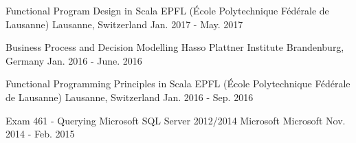   \begin{cventries}
    \cventry{}{}{}{}{}

    \cventry
      {Functional Program Design in Scala}
      {EPFL (École Polytechnique Fédérale de Lausanne)}
      {Lausanne, Switzerland}
      {Jan. 2017 - May. 2017}
      {}

    \cventry
      {Business Process and Decision Modelling}
      {Hasso Plattner Institute}
      {Brandenburg, Germany}
      {Jan. 2016 - June. 2016}
      {}

    \cventry
      {Functional Programming Principles in Scala}
      {EPFL (École Polytechnique Fédérale de Lausanne)}
      {Lausanne, Switzerland}
      {Jan. 2016 - Sep. 2016}
      {}

    \cventry
      {Exam 461 - Querying Microsoft SQL Server 2012/2014}
      {Microsoft}
      {Microsoft}
      {Nov. 2014 - Feb. 2015}
      {}

  \end{cventries}